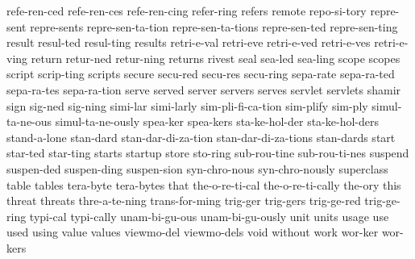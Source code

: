 {    refe-ren-ced
    refe-ren-ces
    refe-ren-cing
    refer-ring
    refers
    remote
    repo-si-tory
    repre-sent
    repre-sents
    repre-sen-ta-tion
    repre-sen-ta-tions
    repre-sen-ted
    repre-sen-ting
    result
    resul-ted
    resul-ting
    results
    retri-e-val
    retri-eve
    retri-e-ved
    retri-e-ves
    retri-e-ving
    return
    retur-ned
    retur-ning
    returns
    rivest
    seal
    sea-led
    sea-ling
    scope
    scopes
    script
    scrip-ting
    scripts
    secure
    secu-red
    secu-res
    secu-ring
    sepa-rate
    sepa-ra-ted
    sepa-ra-tes
    sepa-ra-tion
    serve
    served
    server
    servers
    serves
    servlet
    servlets
    shamir
    sign
    sig-ned
    sig-ning
    simi-lar
    simi-larly
    sim-pli-fi-ca-tion
    sim-plify
    sim-ply
    simul-ta-ne-ous
    simul-ta-ne-ously
    spea-ker
    spea-kers
    sta-ke-hol-der
    sta-ke-hol-ders
    stand-a-lone
    stan-dard
    stan-dar-di-za-tion
    stan-dar-di-za-tions
    stan-dards
    start
    star-ted
    star-ting
    starts
    startup
    store
    sto-ring
    sub-rou-tine
    sub-rou-ti-nes
    suspend
    suspen-ded
    suspen-ding
    suspen-sion
    syn-chro-nous
    syn-chro-nously
    superclass
    table
    tables
    tera-byte
    tera-bytes
    that
    the-o-re-ti-cal
    the-o-re-ti-cally
    the-ory
    this
    threat
    threats
    thre-a-te-ning
    trans-for-ming
    trig-ger
    trig-gers
    trig-ge-red
    trig-ge-ring
    typi-cal
    typi-cally
    unam-bi-gu-ous
    unam-bi-gu-ously
    unit
    units
    usage
    use
    used
    using
    value
    values
    viewmo-del
    viewmo-dels
    void
    without
    work
    wor-ker
    wor-kers
}
